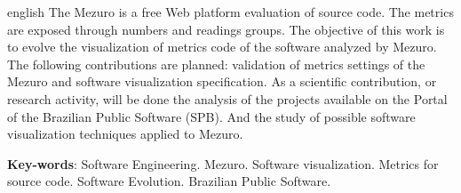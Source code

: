 \begin{resumo}[Abstract]
 \begin{otherlanguage*}{english}
   The Mezuro is a free Web platform evaluation of source code. The metrics are
   exposed through numbers and readings groups. The objective of this work is
   to evolve the visualization of metrics code of the software analyzed by
   Mezuro.
   The following contributions are planned: validation of metrics settings of
   the Mezuro and software visualization specification.
   As a scientific contribution, or research activity, will be done the analysis
   of the projects available on the Portal of the Brazilian Public Software
   (SPB).
   And the study of possible software visualization techniques applied to
   Mezuro.

   \vspace{\onelineskip}

   \noindent
   \textbf{Key-words}: Software Engineering. Mezuro. Software visualization.
   Metrics for source code. Software Evolution. Brazilian Public Software.
 \end{otherlanguage*}
\end{resumo}
